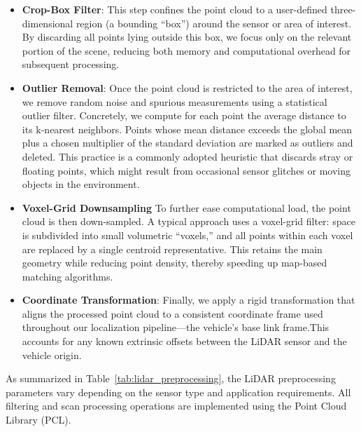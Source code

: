 \begin{itemize}
    \item \textbf{Crop-Box Filter}: This step confines the point cloud to a user-defined three-dimensional region (a bounding “box”) around the sensor or area of interest. By discarding all points lying outside this box, we focus only on the relevant portion of the scene, reducing both memory and computational overhead for subsequent processing.
    \item \textbf{Outlier Removal}: Once the point cloud is restricted to the area of interest, we remove random noise and spurious measurements using a statistical outlier filter. Concretely, we compute for each point the average distance to its k‐nearest neighbors. Points whose mean distance exceeds the global mean plus a chosen multiplier of the standard deviation are marked as outliers and deleted. This practice is a commonly adopted heuristic that discards stray or floating points, which might result from occasional sensor glitches or moving objects in the environment.
    \item \textbf{Voxel-Grid Downsampling} To further ease computational load, the point cloud is then down-sampled. A typical approach uses a voxel-grid filter: space is subdivided into small volumetric “voxels,” and all points within each voxel are replaced by a single centroid representative. This retains the main geometry while reducing point density, thereby speeding up map‐based matching algorithms.
    \item \textbf{Coordinate Transformation}:   Finally, we apply a rigid transformation that aligns the processed point cloud to a consistent coordinate frame used throughout our localization pipeline—the vehicle’s base link frame.This accounts for any known extrinsic offsets between the LiDAR sensor and the vehicle origin.
\end{itemize}

As summarized in Table~\ref{tab:lidar_preprocessing}, the LiDAR preprocessing parameters vary depending on the sensor type and application requirements. All filtering and scan processing operations are implemented using the Point Cloud Library (PCL).



